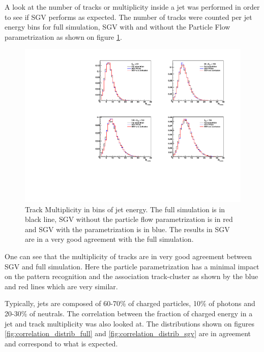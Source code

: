 A look at the number of tracks or multiplicity inside a jet was performed in order to see if SGV performs as expected. The number of tracks were counted per jet energy bins for full simulation, SGV with and without the Particle Flow parametrization as shown on figure \ref{fig:trk_multiplicity}.

\begin{figure}[htbp!]
  \centering
  \includegraphics[width=1\linewidth]{../Thesis_Plots/SGV/Plots/multiplicity_jet_track.pdf}
  \caption{Track Multiplicity in bins of jet energy. The full simulation is in black line, SGV without the particle flow parametrization is in red and SGV with the parametrization is in blue. The results in SGV are in a very good agreement with the full simulation.}
  \label{fig:trk_multiplicity}
\end{figure}

One can see that the multiplicity of tracks are in very good agreement between SGV and full simulation. Here the particle parametrization has a minimal impact on the pattern recognition and the association track-cluster as shown by the blue and red lines which are very similar.

Typically, jets are composed of 60-70\% of charged particles, 10\% of photons and 20-30\% of neutrals. The correlation between the fraction of charged energy in a jet and track multiplicity was also looked at. The distributions shown on figures \ref{fig:correlation_distrib_full} and \ref{fig:correlation_distrib_sgv} are in agreement and correspond to what is expected.

